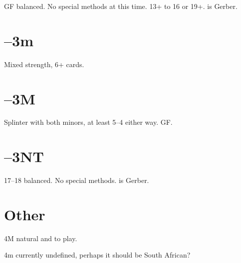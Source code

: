 \documentclass[tom-ari]{subfiles}
\begin{document}
GF balanced. No special methods at this time. 13+ to 16 or 19+.   is Gerber.

\section[1D--3m]{--3m}

Mixed strength, 6+ cards.

\section[1D--3M]{--3M}

Splinter with both minors, at least 5--4 either way. GF.

\section[1D--3NT]{--3NT}

17--18 balanced. No special methods.  is Gerber.

\section{Other}

4M natural and to play.

4m currently undefined, perhaps it should be South African?
\end{document}
